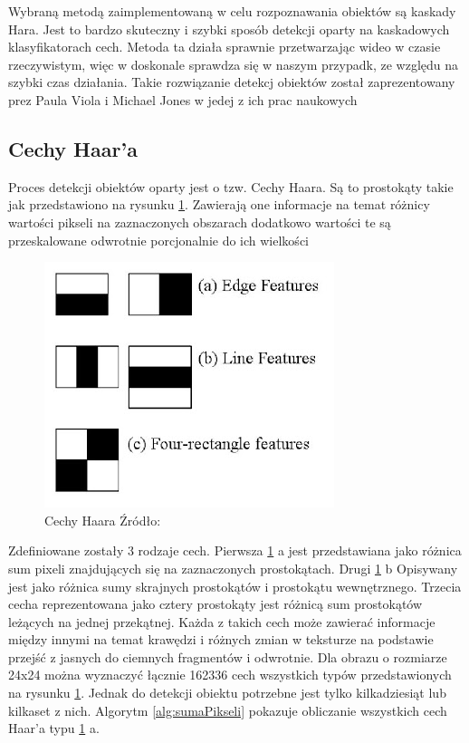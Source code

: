 \documentclass{article}
\numberwithin{equation}{section}
\begin{document}
Wybraną metodą zaimplementowaną w celu rozpoznawania obiektów są kaskady Hara. Jest to bardzo skuteczny i szybki sposób detekcji oparty na kaskadowych klasyfikatorach cech. Metoda ta działa sprawnie przetwarzając wideo w czasie rzeczywistym, więc w doskonale sprawdza się w naszym przypadk, ze względu na szybki czas działania. Takie rozwiązanie detekcj obiektów został zaprezentowany prez Paula Viola i Michael Jones w jedej z ich prac naukowych \cite{violaJones}

\subsection{Cechy Haar'a}
Proces detekcji obiektów oparty jest o tzw. Cechy Haara. Są to prostokąty takie jak przedstawiono na rysunku \ref{fig:cechyHaara}. Zawierają one informacje na temat różnicy wartości pikseli na zaznaczonych obszarach dodatkowo wartości te są przeskalowane odwrotnie porcjonalnie do ich wielkości
\begin{figure}[H]
\centering
\includegraphics[scale=0.5]{cechy.jpg}
\caption{\textsf{Cechy Haara Źródło:} \cite{faceDetectionOpenCV}}
\label{fig:cechyHaara}
\end{figure}

Zdefiniowane zostały 3 rodzaje cech. Pierwsza \ref{fig:cechyHaara} a jest przedstawiana jako różnica sum pixeli znajdujących się na zaznaczonych prostokątach. Drugi \ref{fig:cechyHaara} b  Opisywany jest jako różnica sumy skrajnych prostokątów i prostokątu wewnętrznego. Trzecia cecha reprezentowana jako cztery prostokąty jest różnicą sum prostokątów leżących na jednej przekątnej. Każda z takich cech może zawierać informacje między innymi na temat krawędzi i różnych zmian w teksturze na podstawie przejść z jasnych do ciemnych fragmentów i odwrotnie. Dla obrazu o rozmiarze 24x24 można wyznaczyć łącznie 162336 cech wszystkich typów przedstawionych na rysunku \ref{fig:cechyHaara}. Jednak do detekcji obiektu potrzebne jest tylko kilkadziesiąt lub kilkaset z nich. Algorytm \ref{alg:sumaPikseli} pokazuje obliczanie wszystkich cech Haar'a typu \ref{fig:cechyHaara} a.
\end{document}
